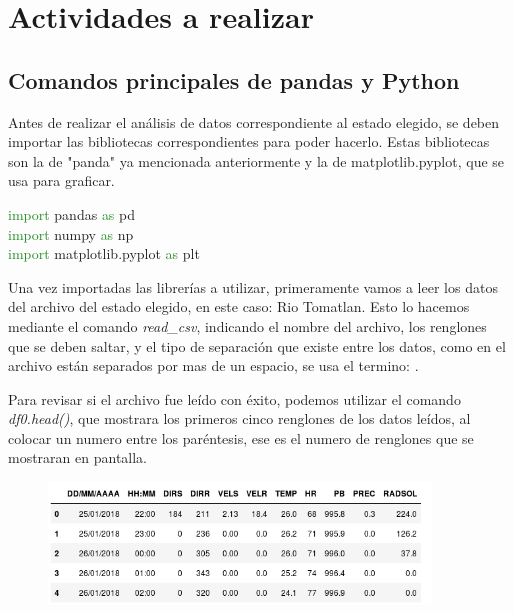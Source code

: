 \documentclass[12pt]{article}
\begin{document}
\section{Actividades a realizar}
\subsection{Comandos principales de pandas y Python}
Antes de realizar el análisis de datos correspondiente al estado elegido, se deben importar las bibliotecas correspondientes para poder hacerlo. Estas bibliotecas son la de "panda" ya mencionada anteriormente y la de  matplotlib.pyplot, que se usa para graficar.\\

\begin{center}
\textcolor{ForestGreen} {import} pandas \textcolor{ForestGreen}{as} pd\\
\textcolor{ForestGreen} {import} numpy \textcolor{ForestGreen} {as} np\\
\textcolor{ForestGreen} {import} matplotlib.pyplot \textcolor{ForestGreen} {as} plt
\end{center}

Una vez importadas las librerías a utilizar, primeramente vamos a leer los datos del archivo del estado elegido, en este caso: Rio Tomatlan. Esto lo hacemos mediante el comando \textit{read\_csv}, indicando el nombre del archivo, los renglones que se deben saltar, y el tipo de separación que existe entre los datos, como en el archivo están separados por mas de un espacio, se usa el termino: . 

\begin{center}
\end{center}

Para revisar si el archivo fue leído con éxito, podemos utilizar el comando \textit{df0.head()}, que mostrara los primeros cinco renglones de los datos leídos, al colocar un numero entre los paréntesis, ese es el numero de renglones que se mostraran en pantalla.

\begin{figure}[h]
    \centering
\includegraphics[width=4in]{tabla5ren.png}
\end{figure}
\end{document}
